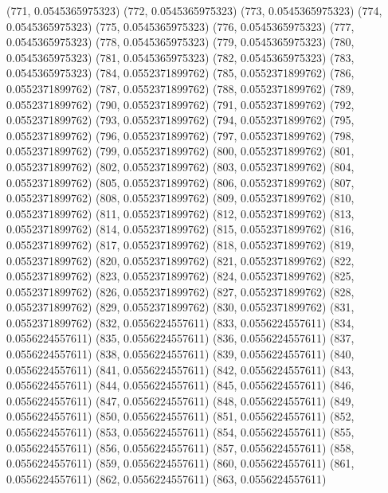 {					(771, 0.0545365975323)
					(772, 0.0545365975323)
					(773, 0.0545365975323)
					(774, 0.0545365975323)
					(775, 0.0545365975323)
					(776, 0.0545365975323)
					(777, 0.0545365975323)
					(778, 0.0545365975323)
					(779, 0.0545365975323)
					(780, 0.0545365975323)
					(781, 0.0545365975323)
					(782, 0.0545365975323)
					(783, 0.0545365975323)
					(784, 0.0552371899762)
					(785, 0.0552371899762)
					(786, 0.0552371899762)
					(787, 0.0552371899762)
					(788, 0.0552371899762)
					(789, 0.0552371899762)
					(790, 0.0552371899762)
					(791, 0.0552371899762)
					(792, 0.0552371899762)
					(793, 0.0552371899762)
					(794, 0.0552371899762)
					(795, 0.0552371899762)
					(796, 0.0552371899762)
					(797, 0.0552371899762)
					(798, 0.0552371899762)
					(799, 0.0552371899762)
					(800, 0.0552371899762)
					(801, 0.0552371899762)
					(802, 0.0552371899762)
					(803, 0.0552371899762)
					(804, 0.0552371899762)
					(805, 0.0552371899762)
					(806, 0.0552371899762)
					(807, 0.0552371899762)
					(808, 0.0552371899762)
					(809, 0.0552371899762)
					(810, 0.0552371899762)
					(811, 0.0552371899762)
					(812, 0.0552371899762)
					(813, 0.0552371899762)
					(814, 0.0552371899762)
					(815, 0.0552371899762)
					(816, 0.0552371899762)
					(817, 0.0552371899762)
					(818, 0.0552371899762)
					(819, 0.0552371899762)
					(820, 0.0552371899762)
					(821, 0.0552371899762)
					(822, 0.0552371899762)
					(823, 0.0552371899762)
					(824, 0.0552371899762)
					(825, 0.0552371899762)
					(826, 0.0552371899762)
					(827, 0.0552371899762)
					(828, 0.0552371899762)
					(829, 0.0552371899762)
					(830, 0.0552371899762)
					(831, 0.0552371899762)
					(832, 0.0556224557611)
					(833, 0.0556224557611)
					(834, 0.0556224557611)
					(835, 0.0556224557611)
					(836, 0.0556224557611)
					(837, 0.0556224557611)
					(838, 0.0556224557611)
					(839, 0.0556224557611)
					(840, 0.0556224557611)
					(841, 0.0556224557611)
					(842, 0.0556224557611)
					(843, 0.0556224557611)
					(844, 0.0556224557611)
					(845, 0.0556224557611)
					(846, 0.0556224557611)
					(847, 0.0556224557611)
					(848, 0.0556224557611)
					(849, 0.0556224557611)
					(850, 0.0556224557611)
					(851, 0.0556224557611)
					(852, 0.0556224557611)
					(853, 0.0556224557611)
					(854, 0.0556224557611)
					(855, 0.0556224557611)
					(856, 0.0556224557611)
					(857, 0.0556224557611)
					(858, 0.0556224557611)
					(859, 0.0556224557611)
					(860, 0.0556224557611)
					(861, 0.0556224557611)
					(862, 0.0556224557611)
					(863, 0.0556224557611)
}
